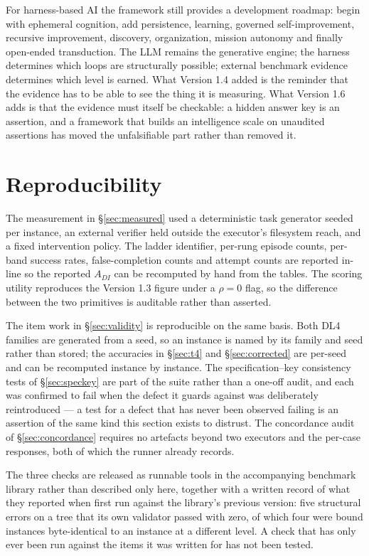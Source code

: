 \documentclass[11pt]{article}
\theoremstyle{definition}
\begin{document}
For harness-based AI the framework still provides a development roadmap: begin with ephemeral cognition, add persistence, learning, governed self-improvement, recursive improvement, discovery, organization, mission autonomy and finally open-ended transduction. The LLM remains the generative engine; the harness determines which loops are structurally possible; external benchmark evidence determines which level is earned. What Version 1.4 added is the reminder that the evidence has to be able to see the thing it is measuring. What Version 1.6 adds is that the evidence must itself be checkable: a hidden answer key is an assertion, and a framework that builds an intelligence scale on unaudited assertions has moved the unfalsifiable part rather than removed it.

\section*{Reproducibility}

The measurement in \S\ref{sec:measured} used a deterministic task generator seeded per instance, an external verifier held outside the executor's filesystem reach, and a fixed intervention policy. The ladder identifier, per-rung episode counts, per-band success rates, false-completion counts and attempt counts are reported in-line so the reported $A_{DI}$ can be recomputed by hand from the tables. The scoring utility reproduces the Version 1.3 figure under a $\rho = 0$ flag, so the difference between the two primitives is auditable rather than asserted.

The item work in \S\ref{sec:validity} is reproducible on the same basis. Both DL4 families are generated from a seed, so an instance is named by its family and seed rather than stored; the accuracies in \S\ref{sec:t4} and \S\ref{sec:corrected} are per-seed and can be recomputed instance by instance. The specification--key consistency tests of \S\ref{sec:speckey} are part of the suite rather than a one-off audit, and each was confirmed to fail when the defect it guards against was deliberately reintroduced --- a test for a defect that has never been observed failing is an assertion of the same kind this section exists to distrust. The concordance audit of \S\ref{sec:concordance} requires no artefacts beyond two executors and the per-case responses, both of which the runner already records.

The three checks are released as runnable tools in the accompanying benchmark library rather than described only here, together with a written record of what they reported when first run against the library's previous version: five structural errors on a tree that its own validator passed with zero, of which four were bound instances byte-identical to an instance at a different level. A check that has only ever been run against the items it was written for has not been tested.
\end{document}

